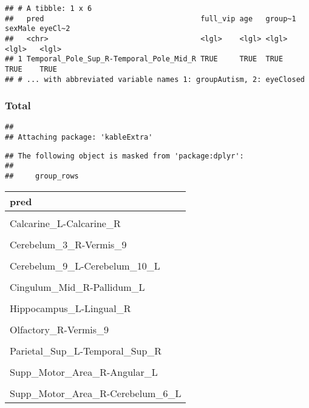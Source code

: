 \documentclass[
]{article}
\begin{document}
\begin{verbatim}
## # A tibble: 1 x 6
##   pred                                    full_vip age   group~1 sexMale eyeCl~2
##   <chr>                                   <lgl>    <lgl> <lgl>   <lgl>   <lgl>  
## 1 Temporal_Pole_Sup_R-Temporal_Pole_Mid_R TRUE     TRUE  TRUE    TRUE    TRUE   
## # ... with abbreviated variable names 1: groupAutism, 2: eyeClosed
\end{verbatim}

\hypertarget{total-1}{%
\subsubsection{Total}\label{total-1}}

\begin{verbatim}
## 
## Attaching package: 'kableExtra'
\end{verbatim}

\begin{verbatim}
## The following object is masked from 'package:dplyr':
## 
##     group_rows
\end{verbatim}

\begin{table}
\centering
\begin{tabular}[t]{l}
\hline
pred\\
\hline
\cellcolor{gray!6}{Amygdala\_R-Paracentral\_Lobule\_R}\\
\hline
Calcarine\_L-Calcarine\_R\\
\hline
\cellcolor{gray!6}{Cerebelum\_10\_R-Vermis\_1\_2}\\
\hline
Cerebelum\_3\_R-Vermis\_9\\
\hline
\cellcolor{gray!6}{Cerebelum\_8\_L-Cerebelum\_9\_L}\\
\hline
Cerebelum\_9\_L-Cerebelum\_10\_L\\
\hline
\cellcolor{gray!6}{Cingulum\_Ant\_R-Occipital\_Inf\_R}\\
\hline
Cingulum\_Mid\_R-Pallidum\_L\\
\hline
\cellcolor{gray!6}{Frontal\_Sup\_Medial\_L-Frontal\_Med\_Orb\_L}\\
\hline
Hippocampus\_L-Lingual\_R\\
\hline
\cellcolor{gray!6}{Occipital\_Inf\_R-Precuneus\_L}\\
\hline
Olfactory\_R-Vermis\_9\\
\hline
\cellcolor{gray!6}{Parietal\_Sup\_L-Parietal\_Inf\_L}\\
\hline
Parietal\_Sup\_L-Temporal\_Sup\_R\\
\hline
\cellcolor{gray!6}{Rectus\_R-Occipital\_Inf\_R}\\
\hline
Supp\_Motor\_Area\_R-Angular\_L\\
\hline
\cellcolor{gray!6}{Supp\_Motor\_Area\_R-Calcarine\_R}\\
\hline
Supp\_Motor\_Area\_R-Cerebelum\_6\_L\\
\hline
\end{tabular}
\end{table}
\end{document}
